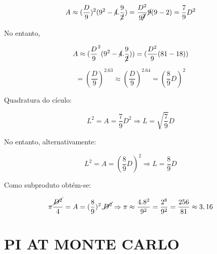 \documentclass[a4paper, 12pt]{article}
\begin{document}
    \begin{figure} [h!]
        \begin{minipage}[!] {0.5\linewidth}
            \caption{}
        \end{minipage}
        \begin{minipage}[!] {0.5\linewidth}
            \[A \approx (\frac{D}{9})^2(9^2 - \cancel{4}.\frac{9}{\cancel{2}}) = \frac{D^2}{9\cancel{^2}}\cancel{9}(9-2) = \frac{7}{9}D^2\]
        \end{minipage}
    \end{figure}
    
    No entanto, 
    
    \[A \approx (\frac{D}{9}^2 (9^2-\cancel{4}.\frac{9}{\cancel{2}})) = (\frac{D^2}{9} (81-18))\]
    
    \[= (\frac{D}{9})^2.63 \approx (\frac{D}{9})^2.64=(\frac{8}{9}D)^2\]
    
    Quadratura do cículo:
    
    \[L^2 = A = \frac{7}{9}D^2 \Rightarrow L = \sqrt{\frac{7}{9}}D\]
    
    No entanto, alternativamente: 
    
    \[L^2 = A = (\frac{8}{9}D)^2 \Rightarrow L=\frac{8}{9}D\]
    
    Como subproduto obtém-se:
    
    \[\pi \frac{\cancel{D^2}}{4} = A = (\frac{8}{9})^2.\cancel{D^2} \Rightarrow \pi \approx \frac{4.8^2}{9^2} = \frac{2^8}{9^2} = \frac{256}{81} \approx 3,16\]
    
    \newpage
    \section{PI AT MONTE CARLO}
    
\end{document}
